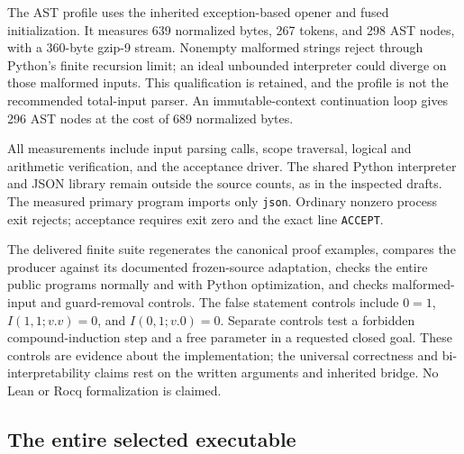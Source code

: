 The AST profile uses the inherited exception-based opener and fused
initialization.  It measures 639 normalized bytes, 267 tokens, and
298 AST nodes, with a 360-byte gzip-9 stream.  Nonempty malformed strings
reject through Python's finite recursion limit; an ideal unbounded
interpreter could diverge on those malformed inputs.  This qualification
is retained, and the profile is not the recommended total-input parser.
An immutable-context continuation loop gives 296 AST nodes at the cost
of 689 normalized bytes.

All measurements include input parsing calls, scope traversal, logical
and arithmetic verification, and the acceptance driver.  The shared
Python interpreter and JSON library remain outside the source counts,
as in the inspected drafts.  The measured primary program imports only
\texttt{json}.  Ordinary nonzero process exit rejects; acceptance requires
exit zero and the exact line \texttt{ACCEPT}.

The delivered finite suite regenerates the canonical proof examples,
compares the producer against its documented frozen-source adaptation,
checks the entire public programs normally and with Python optimization,
and checks malformed-input and guard-removal controls.  The false
statement controls include $0=1$, $I(1,1;v.v)=0$, and
$I(0,1;v.0)=0$.  Separate controls test a forbidden compound-induction
step and a free parameter in a requested closed goal.  These controls
are evidence about the implementation; the universal correctness and
bi-interpretability claims rest on the written arguments and inherited
bridge.  No Lean or Rocq formalization is claimed.

\subsection{The entire selected executable}

